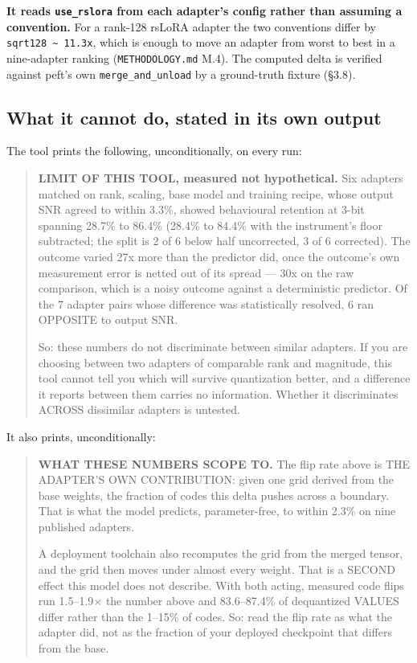 \textbf{It reads \texttt{use\_\allowbreak{}rslora} from each adapter's config rather than assuming a convention.} For a rank-128 rsLoRA adapter the two conventions differ by \texttt{sqrt128 \textasciitilde{} 11.\allowbreak{}3x}, which is enough to move an adapter from worst to best in a nine-adapter ranking (\texttt{METHODOLOGY.\allowbreak{}md} M.4). The computed delta is verified against peft's own \texttt{merge\_\allowbreak{}and\_\allowbreak{}unload} by a ground-truth fixture (\S{}3.8).

\subsection{What it cannot do, stated in its own output}

The tool prints the following, unconditionally, on every run:

\begin{quote}\small
\textbf{LIMIT OF THIS TOOL, measured not hypothetical.} Six adapters matched on rank, scaling, base model and training recipe, whose output SNR agreed to within 3.3\%, showed behavioural retention at 3-bit spanning 28.7\% to 86.4\% (28.4\% to 84.4\% with the instrument's floor subtracted; the split is 2 of 6 below half uncorrected, 3 of 6 corrected). The outcome varied 27x more than the predictor did, once the outcome's own measurement error is netted out of its spread --- 30x on the raw comparison, which is a noisy outcome against a deterministic predictor. Of the 7 adapter pairs whose difference was statistically resolved, 6 ran OPPOSITE to output SNR.

So: these numbers do not discriminate between similar adapters. If you are choosing between two adapters of comparable rank and magnitude, this tool cannot tell you which will survive quantization better, and a difference it reports between them carries no information. Whether it discriminates ACROSS dissimilar adapters is untested.
\end{quote}

It also prints, unconditionally:

\begin{quote}\small
\textbf{WHAT THESE NUMBERS SCOPE TO.} The flip rate above is THE ADAPTER'S OWN CONTRIBUTION: given one grid derived from the base weights, the fraction of codes this delta pushes across a boundary. That is what the model predicts, parameter-free, to within 2.3\% on nine published adapters.

A deployment toolchain also recomputes the grid from the merged tensor, and the grid then moves under almost every weight. That is a SECOND effect this model does not describe. With both acting, measured code flips run 1.5--1.9$\times$ the number above and 83.6--87.4\% of dequantized VALUES differ rather than the 1--15\% of codes. So: read the flip rate as what the adapter did, not as the fraction of your deployed checkpoint that differs from the base.
\end{quote}

